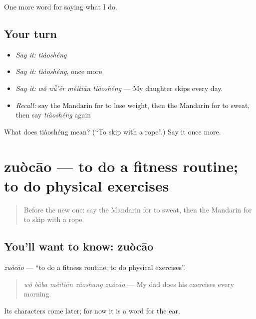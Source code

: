 \begin{grammarlens}[title={What you've built}]
One more word for saying what I do.
\end{grammarlens}

\subsection*{Your turn}
\begin{itemize}
\raggedright
  \item \emph{Say it:} \emph{tiàoshéng}
  \item \emph{Say it:} \emph{tiàoshéng}, once more
  \item \emph{Say it:} \emph{wǒ nǚ'ér měitiān tiàoshéng} — My daughter skips every day.
  \item \emph{Recall:} say the Mandarin for to lose weight, then the Mandarin for to sweat, then say \emph{tiàoshéng} again
\end{itemize}

\begin{tcolorbox}[breakable,colback=teal!4,colframe=teal!35!black,title={Before you move on}]
What does tiàoshéng mean? (\textquotedblleft{}To skip with a rope\textquotedblright{}.) Say it once more.
\end{tcolorbox}
\section[zuòcāo]{zuòcāo — to do a fitness routine; to do physical exercises}

\label{lesson:ZH-C220-zuocao}



\begin{quote}
Before the new one: say the Mandarin for to sweat, then the Mandarin for to skip with a rope.
\end{quote}

\subsection*{You'll want to know: zuòcāo}
\emph{zuòcāo} — \textquotedblleft{}to do a fitness routine; to do physical exercises\textquotedblright{}.

\begin{quote}
\emph{wǒ bàba měitiān zǎoshang zuòcāo} — My dad does his exercises every morning.
\end{quote}

Its characters come later; for now it is a word for the ear.

